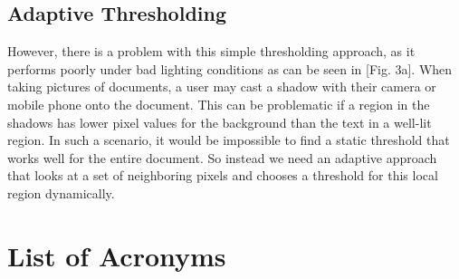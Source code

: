 \documentclass[bibliography=totoc]{scrartcl}
\begin{document}
		\subsection{Adaptive Thresholding}
		However, there is a problem with this simple thresholding approach, as it performs poorly under bad lighting conditions as can be seen in [Fig. 3a].
		When taking pictures of documents, a user may cast a shadow with their camera or mobile phone onto the document. 
		This can be problematic if a region in the shadows has lower pixel values for the background than the text in a well-lit region.
		In such a scenario, it would be impossible to find a static threshold that works well for the entire document.
		So instead we need an adaptive approach that looks at a set of neighboring pixels and chooses a threshold for this local region dynamically.

			
\section*{List of Acronyms} 

\begin{acronym}[....]
\end{acronym}
			

\end{document}
